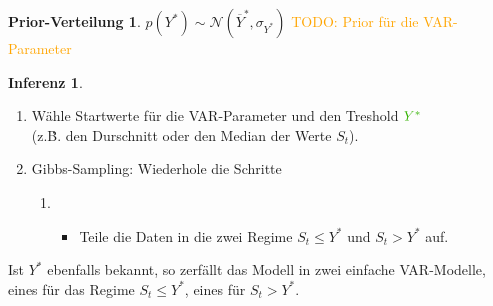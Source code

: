 \documentclass[10pt]{beamer}
\theoremstyle{definition}
\newtheorem*{prior}{Prior-Verteilung}
\newtheorem*{inference}{Inferenz}
\newcommand{\Normal}{\mathcal{N}} %
\newcommand{\TODO}[1]{\textcolor{orange}{TODO: #1}}
\newcommand{\stepOne}[1]{\textcolor{StepOneColor}{#1}}
\newcommand{\stepTwo}[1]{\textcolor{StepTwoColor}{#1}}
\begin{document}
\begin{frame}
  \begin{prior}
    $p(Y^*) \sim \Normal(\overline{Y}^*, \sigma_{Y^*})$
    \TODO{Prior für die VAR-Parameter}
  \end{prior}

  \begin{inference}
    \begin{enumerate}
      \item Wähle Startwerte für die \stepOne{VAR-Parameter} und den Treshold $\stepTwo{Y^*}$ \\ (z.\.B. den Durschnitt oder den Median der Werte $S_t$).
      \item Gibbs-Sampling: Wiederhole die Schritte
      \begin{enumerate}
        \item
        \begin{itemize}
          \item Teile die Daten in die zwei Regime $S_t \leq Y^*$ und $S_t > Y^*$ auf.
        \end{itemize}
      \end{enumerate}
    \end{enumerate}
    Ist $Y^*$ ebenfalls bekannt, so zerfällt das Modell in zwei einfache VAR-Modelle, eines für das Regime $S_t \leq Y^*$, eines für $S_t > Y^*$.
  \end{inference}
\end{frame}
\end{document}
